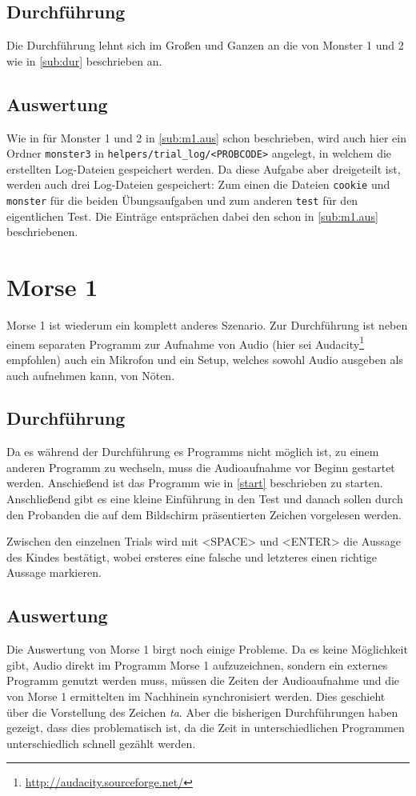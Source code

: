 \documentclass[a4paper]{scrartcl}
\newtheorem[M]{thmL}{Definition}
\begin{document}
\subsection{Durchführung}
Die Durchführung lehnt sich im Großen und Ganzen an die von Monster 1 und 2 wie in \autoref{sub:dur} beschrieben an.

\subsection{Auswertung}
Wie in für Monster 1 und 2 in \autoref{sub:m1.aus} schon beschrieben, wird auch hier ein Ordner \verb+monster3+ in \verb+helpers/trial_log/<PROBCODE>+ angelegt, in welchem die erstellten Log-Dateien gespeichert werden. Da diese Aufgabe aber dreigeteilt ist, werden auch drei Log-Dateien gespeichert: Zum einen die Dateien \verb+cookie+ und \verb+monster+ für die beiden Übungsaufgaben und zum anderen \verb+test+ für den eigentlichen Test. Die Einträge entsprächen dabei den schon in \autoref{sub:m1.aus} beschriebenen.

\section{Morse 1}
Morse 1 ist wiederum ein komplett anderes Szenario. Zur Durchführung ist neben einem separaten Programm zur Aufnahme von Audio (hier sei Audacity\footnote{\url{http://audacity.sourceforge.net/}} empfohlen) auch ein Mikrofon und ein Setup, welches sowohl Audio ausgeben als auch aufnehmen kann, von Nöten.

\subsection{Durchführung}
Da es während der Durchführung es Programms nicht möglich ist, zu einem anderen Programm zu wechseln, muss die Audioaufnahme vor Beginn gestartet werden. Anschießend ist das Programm wie in \autoref{start} beschrieben zu starten. Anschließend gibt es eine kleine Einführung in den Test und danach sollen durch den Probanden die auf dem Bildschirm präsentierten Zeichen vorgelesen werden.

Zwischen den einzelnen Trials wird mit <SPACE> und <ENTER> die Aussage des Kindes bestätigt, wobei ersteres eine falsche und letzteres einen richtige Aussage markieren.

\subsection{Auswertung}
Die Auswertung von Morse 1 birgt noch einige Probleme. Da es keine Möglichkeit gibt, Audio direkt im Programm Morse 1 aufzuzeichnen, sondern ein externes Programm genutzt werden muss, müssen die Zeiten der Audioaufnahme und die von Morse 1 ermittelten im Nachhinein synchronisiert werden. Dies geschieht über die Vorstellung des Zeichen \emph{ta}. Aber die bisherigen Durchführungen haben gezeigt, dass dies problematisch ist, da die Zeit in unterschiedlichen Programmen unterschiedlich schnell gezählt werden.
\end{document}

